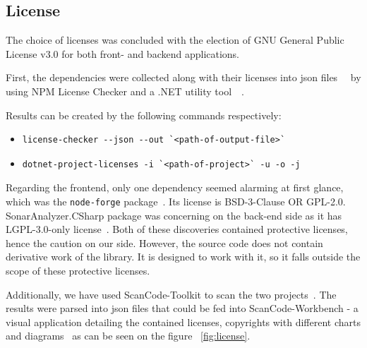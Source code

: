 \subsection{License}

The choice of licenses was concluded with the election of GNU General Public License v3.0 for both front- and backend applications.

First, the dependencies were collected along with their licenses into json files~\cite{licensesJsonFrontend}~\cite{licensesJsonBackend} by using NPM License Checker and  a .NET utility tool~\cite{NPMLicenseChecker}~\cite{nugetLicense}.

Results can be created by the following commands respectively:

\begin{itemize}[noitemsep]
    \item 
\begin{verbatim}
license-checker --json --out `<path-of-output-file>`
\end{verbatim}

    \item 
\begin{verbatim}
dotnet-project-licenses -i `<path-of-project>` -u -o -j
\end{verbatim}

\end{itemize}

Regarding the frontend, only one dependency seemed alarming at first glance, which was the \texttt{node-forge} package~\cite{nodeForge}. Its license is BSD-3-Clause OR GPL-2.0. SonarAnalyzer.CSharp package was concerning on the back-end side as it has LGPL-3.0-only license~\cite{sonarAnalyzerCSharp}. Both of these discoveries contained protective licenses, hence the caution on our side. However, the source code does not contain derivative work of the library. It is designed to work with it, so it falls outside the scope of these protective licenses.
\vspace{3mm}

Additionally, we have used ScanCode-Toolkit to scan the two projects~\cite{scanCodeToolkit}. The results were parsed into json files that could be fed into ScanCode-Workbench - a visual application detailing the contained licenses, copyrights with different charts and diagrams~\cite{scanCodeWorkbench} as can be seen on the figure ~\ref{fig:license}.

